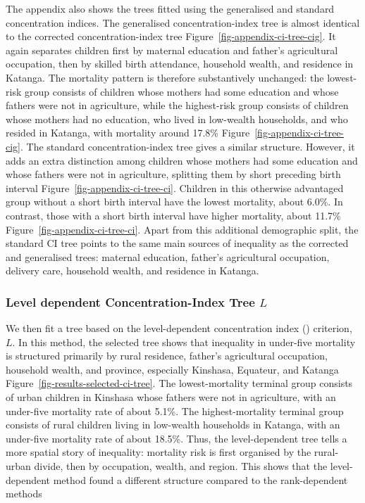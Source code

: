 \documentclass[
  11pt,
  a4paper,
]{article}
\begin{document}
The appendix also shows the trees fitted using the generalised and
standard concentration indices. The generalised concentration-index tree
is almost identical to the corrected concentration-index tree
Figure~\ref{fig-appendix-ci-tree-cig}. It again separates children first
by maternal education and father's agricultural occupation, then by
skilled birth attendance, household wealth, and residence in Katanga.
The mortality pattern is therefore substantively unchanged: the
lowest-risk group consists of children whose mothers had some education
and whose fathers were not in agriculture, while the highest-risk group
consists of children whose mothers had no education, who lived in
low-wealth households, and who resided in Katanga, with mortality around
17.8\% Figure~\ref{fig-appendix-ci-tree-cig}. The standard
concentration-index tree gives a similar structure. However, it adds an
extra distinction among children whose mothers had some education and
whose fathers were not in agriculture, splitting them by short preceding
birth interval Figure~\ref{fig-appendix-ci-tree-ci}. Children in this
otherwise advantaged group without a short birth interval have the
lowest mortality, about 6.0\%. In contrast, those with a short birth
interval have higher mortality, about 11.7\%
Figure~\ref{fig-appendix-ci-tree-ci}. Apart from this additional
demographic split, the standard CI tree points to the same main sources
of inequality as the corrected and generalised trees: maternal
education, father's agricultural occupation, delivery care, household
wealth, and residence in Katanga.

\subsubsection{\texorpdfstring{Level dependent Concentration-Index Tree
\(L\)}{Level dependent Concentration-Index Tree L}}\label{level-dependent-concentration-index-tree-l}

We then fit a tree based on the level-dependent concentration index
()
criterion, \(L\). In this method, the selected tree shows that
inequality in under-five mortality is structured primarily by rural
residence, father's agricultural occupation, household wealth, and
province, especially Kinshasa, Equateur, and Katanga
Figure~\ref{fig-results-selected-ci-tree}. The lowest-mortality terminal
group consists of urban children in Kinshasa whose fathers were not in
agriculture, with an under-five mortality rate of about 5.1\%. The
highest-mortality terminal group consists of rural children living in
low-wealth households in Katanga, with an under-five mortality rate of
about 18.5\%. Thus, the level-dependent tree tells a more spatial story
of inequality: mortality risk is first organised by the rural-urban
divide, then by occupation, wealth, and region. This shows that the
level-dependent method found a different structure compared to the
rank-dependent methods
\end{document}
